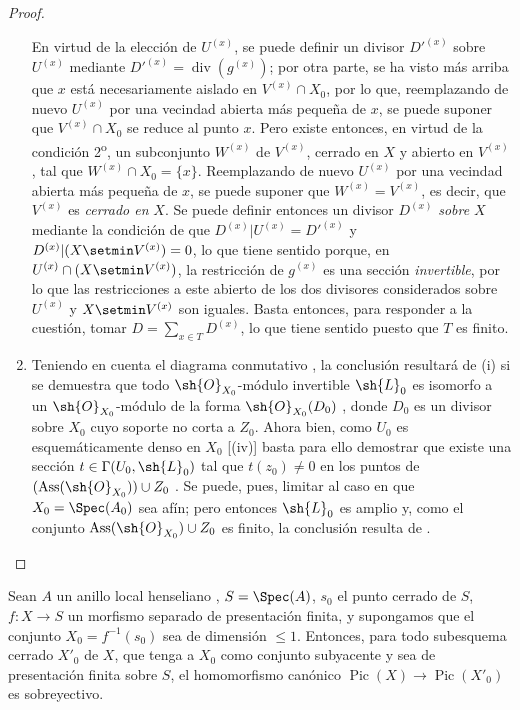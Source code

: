 \begin{proof}
\begin{enumerate}[label=(\roman*)]
En virtud de la elección de $U^{(x)}$, se puede definir un divisor $D'^{(x)}$ sobre $U^{(x)}$ mediante $D'^{(x)}=\operatorname{div}(g^{(x)})$;
por otra parte, se ha visto más arriba que $x$ está necesariamente aislado en $V^{(x)}\cap X_0$, por lo que, reemplazando de nuevo $U^{(x)}$ por una vecindad abierta más pequeña de $x$, se puede suponer que $V^{(x)}\cap X_0$ se reduce al punto $x$.
Pero existe entonces, en virtud de la condición 2\textsuperscript{o}, un subconjunto $W^{(x)}$ de $V^{(x)}$, cerrado en $X$ y abierto en $V^{(x)}$, tal que $W^{(x)}\cap X_0=\{x\}$.
Reemplazando de nuevo $U^{(x)}$ por una vecindad abierta más pequeña de $x$, se puede suponer
que $W^{(x)}=V^{(x)}$, es decir, que $V^{(x)}$ es \emph{cerrado en} $X$.
Se puede definir entonces un divisor $D^{(x)}$ \emph{sobre} $X$ mediante la condición de que $D^{(x)}|U^{(x)}=D'^{(x)}$ y $D^{(x)}|(X\setmin V^{(x)})=0$, lo que tiene sentido porque, en $U^{(x)}\cap(X\setmin V^{(x)})$, la restricción de $g^{(x)}$ es una sección \emph{invertible}, por lo que las restricciones a este abierto de los dos divisores considerados sobre $U^{(x)}$ y $X\setmin V^{(x)}$ son iguales.
Basta entonces, para responder a la cuestión, tomar $D=\sum_{x\in T}D^{(x)}$, lo que tiene sentido puesto que $T$ es finito.

  \item Teniendo en cuenta el diagrama conmutativo , la conclusión resultará de (i) si se demuestra que todo $\sh{O}_{X_0}$-módulo invertible $\sh{L}_0$ es isomorfo a un $\sh{O}_{X_0}$-módulo de la forma $\sh{O}_{X_0}(D_0)$ , donde $D_0$ es un divisor sobre $X_0$ cuyo soporte no corta a $Z_0$.
Ahora bien, como $U_0$ es esquemáticamente denso en $X_0$ [(iv)] basta para ello demostrar que existe una sección $t\in\Gamma(U_0,\sh{L}_0)$ tal que $t(z_0)\neq0$ en los puntos de $(\operatorname{Ass}(\sh{O}_{X_0}))\cup Z_0$ .
Se puede, pues, limitar al caso en que $X_0=\Spec(A_0)$ sea afín;
pero entonces $\sh{L}_0$ es amplio  y, como el conjunto $\operatorname{Ass}(\sh{O}_{X_0})\cup Z_0$ es finito, la conclusión resulta de .
\end{enumerate}
\end{proof}

\begin{corollary}[21.9.12]
\label{IV.21.9.12}
Sean $A$ un anillo local henseliano , $S=\Spec(A)$, $s_0$ el punto cerrado de $S$, $f:X\to S$ un morfismo separado de presentación finita, y supongamos que el conjunto $X_0=f^{-1}(s_0)$ sea de dimensión $\leq1$.
Entonces, para todo subesquema cerrado $X'_0$ de $X$, que tenga a $X_0$ como conjunto subyacente y sea de presentación finita sobre $S$, el homomorfismo canónico  $\operatorname{Pic}(X)\to\operatorname{Pic}(X'_0)$ es sobreyectivo.
\end{corollary}

